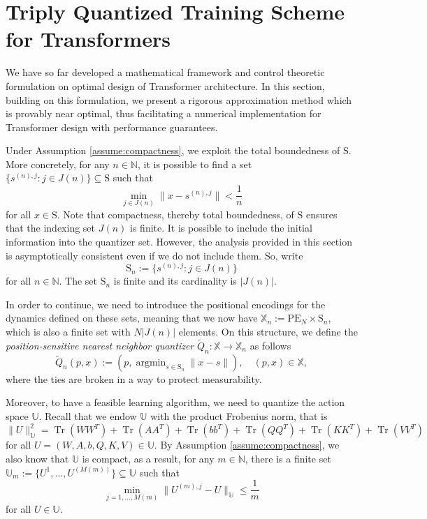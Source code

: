 \documentclass[11pt]{article}
\DeclareMathOperator{\Tr}{Tr}
\newcommand{\NN}{\mathbb{N}}
\newcommand{\XX}{\mathbb{X}}
\newcommand{\UU}{\mathbb{U}}
\begin{document}
\section{Triply Quantized Training Scheme for Transformers}\label{sec:quantization}
We have so far developed a mathematical framework and control theoretic formulation on optimal design of Transformer architecture. In this section, building on this formulation, we present a rigorous approximation method which is provably near optimal, thus facilitating a numerical implementation for Transformer design with performance guarantees.

Under Assumption \ref{assume:compactness}, we exploit the total boundedness of $\mathrm{S}$. More concretely, for any $n\in\NN$, it is possible to find a set $\{s^{(n), j}: j\in J(n)\} \subseteq \mathrm{S}$ such that
\begin{equation*}
    \min_{j\in J(n)} \|x - s^{(n),j}\| < \frac{1}{n}
\end{equation*}
for all $x\in\mathrm{S}$. Note that compactness, thereby total boundedness, of $\mathrm{S}$ ensures that the indexing set $J(n)$ is finite. It is possible to include the initial information into the quantizer set. However, the analysis provided in this section is asymptotically consistent even if we do not include them. So, write 
\begin{equation}
    \mathrm{S}_n := \{s^{(n), j}: j\in J(n)\}
\end{equation}
for all $n\in\NN$. The set $\mathrm{S}_n$ is finite and its cardinality is $|J(n)|$.

In order to continue, we need to introduce the positional encodings for the dynamics defined on these sets, meaning that we now have $\XX_n := \mathrm{PE}_N \times \mathrm{S}_n$, which is also a finite set with $N|J(n)|$ elements. On this structure, we define the \emph{position-sensitive nearest neighbor quantizer} $\tilde{Q}_n: \XX \to \XX_n$ as follows
\begin{equation}
    \tilde{Q}_n(p,x) := (p, \operatorname{argmin}_{s\in\mathrm{S}_n}\|x-s\|), \quad (p,x)\in\XX,
\end{equation}
where the ties are broken in a way to protect measurability.

Moreover, to have a feasible learning algorithm, we need to quantize the action space $\UU$. Recall that we endow $\UU$ with the product Frobenius norm, that is $\|U\|_\UU^2 = \Tr(WW^T) + \Tr(AA^T) + \Tr(bb^T) + \Tr(QQ^T) + \Tr(KK^T) + \Tr(VV^T)$ for all $U=(W,A,b,Q,K,V)\in\UU$. By Assumption \ref{assume:compactness}, we also know that $\UU$ is compact, as a result, for any $m\in\NN$, there is a finite set $\UU_m := \{U^1, \ldots, U^{(M(m))}\} \subseteq \UU$ such that
\begin{equation}
    \min_{j=1,\ldots,M(m)}\|U^{(m),j}-U\|_\UU \leq \frac{1}{m}
\end{equation}
for all $U\in\UU$.
\end{document}
